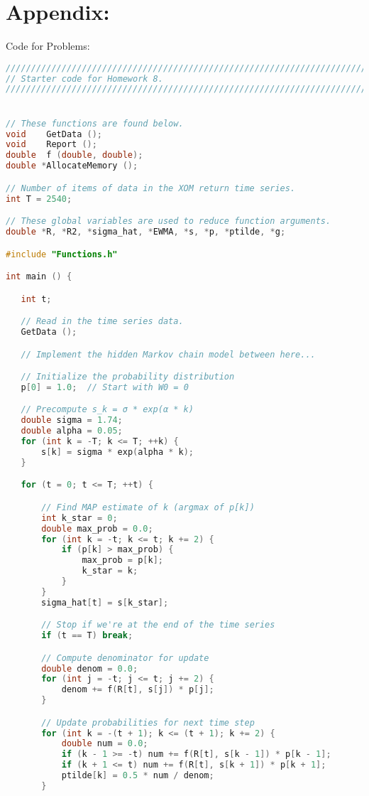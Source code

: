 \documentclass{report}
\begin{document}
\newpage
\section*{Appendix:}
Code for Problems:
\begin{lstlisting}[language=C++]
////////////////////////////////////////////////////////////////////////////////
// Starter code for Homework 8.
////////////////////////////////////////////////////////////////////////////////


// These functions are found below.
void    GetData ();
void    Report ();
double  f (double, double);
double *AllocateMemory ();

// Number of items of data in the XOM return time series.
int T = 2540;

// These global variables are used to reduce function arguments.
double *R, *R2, *sigma_hat, *EWMA, *s, *p, *ptilde, *g;

#include "Functions.h"

int main () {

   int t;

   // Read in the time series data.
   GetData ();

   // Implement the hidden Markov chain model between here...

   // Initialize the probability distribution
   p[0] = 1.0;  // Start with W0 = 0

   // Precompute s_k = σ * exp(α * k)
   double sigma = 1.74;
   double alpha = 0.05;
   for (int k = -T; k <= T; ++k) {
       s[k] = sigma * exp(alpha * k);
   }

   for (t = 0; t <= T; ++t) {

       // Find MAP estimate of k (argmax of p[k])
       int k_star = 0;
       double max_prob = 0.0;
       for (int k = -t; k <= t; k += 2) {
           if (p[k] > max_prob) {
               max_prob = p[k];
               k_star = k;
           }
       }
       sigma_hat[t] = s[k_star];

       // Stop if we're at the end of the time series
       if (t == T) break;

       // Compute denominator for update
       double denom = 0.0;
       for (int j = -t; j <= t; j += 2) {
           denom += f(R[t], s[j]) * p[j];
       }

       // Update probabilities for next time step
       for (int k = -(t + 1); k <= (t + 1); k += 2) {
           double num = 0.0;
           if (k - 1 >= -t) num += f(R[t], s[k - 1]) * p[k - 1];
           if (k + 1 <= t) num += f(R[t], s[k + 1]) * p[k + 1];
           ptilde[k] = 0.5 * num / denom;
       }


\end{lstlisting}
\end{document}
